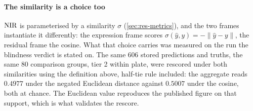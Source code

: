 \paragraph{The similarity is a choice too} $\textrm{NIR}$ is parameterised by a
similarity $\sigma$ (\cref{sec:res-metrics}), and the two frames instantiate it
differently: the expression frame scores $\sigma(\hat y, y) = -\lVert \hat y - y
\rVert$, the residual frame the cosine. What that choice carries was measured on
the run the blindness verdict is stated on. The same $606$ stored predictions
and truths, the same $80$ comparison groups, tier 2 within plate, were rescored
under both similarities using the definition above, half-tie rule included: the
aggregate reads $0.4977$ under the negated Euclidean distance against $0.5007$
under the cosine, both at chance. The Euclidean value reproduces the published
figure on that support, which is what validates the rescore.

